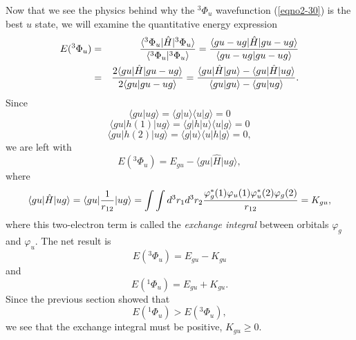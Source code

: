 Now that we see the physics behind why the $^3\Phi_u$ wavefunction
(\ref{eqno2-30}) is the best $u$ state, we will examine the
quantitative energy expression
\begin{eqnarray}
E( ^3\Phi_u) &=& {\langle ^3\Phi_u \vert {\hat H}\vert ^3\Phi_u
\rangle \over \langle ^3\Phi_u \vert ^3\Phi_u \rangle} = {\langle gu -
ug \vert {\hat H} \vert gu - ug \rangle \over \langle gu - ug \vert gu
- ug \rangle}\cr &=& {2 \langle gu \vert {\hat H} \vert gu - ug
\rangle \over 2 \langle gu \vert gu - ug \rangle} = {\langle gu \vert
{\hat H} \vert gu \rangle - \langle gu \vert {\hat H} \vert ug \rangle
\over \langle gu \vert gu \rangle - \langle gu \vert ug \rangle}.
\end{eqnarray}
Since
\begin{equation}
\langle gu \vert ug \rangle = \langle g \vert u \rangle \langle u 
\vert g \rangle = 0
\end{equation}
\begin{equation}
\langle gu \vert h ( 1 ) \vert ug \rangle = \langle g \vert h \vert 
u \rangle \langle u \vert g \rangle = 0
\end{equation}
\begin{equation}
\langle gu \vert h ( 2 ) \vert ug \rangle = \langle g \vert u 
\rangle \langle u \vert h \vert g \rangle = 0,
\end{equation}
we are left with
\begin{equation}
E \left( ^3\Phi_u \right) = E_{gu} - \langle gu \vert {\hat H} \vert 
ug \rangle,
\label{e_trip_u}
\end{equation}
where
\begin{equation}
\langle gu \vert {\hat H} \vert ug \rangle = \langle gu \vert {1 \over 
r_{12}} \vert ug \rangle = \int \int d^3 r_1 d^3 r_2 {\varphi^*_g ( 1 ) 
\varphi_u ( 1 ) \varphi^*_u ( 2 ) \varphi_g ( 2 ) \over r_{12}} 
= K_{gu},
\label{eqno2-32}
\end{equation}
where this two-electron term is called the \emph{exchange integral}
between orbitals $\varphi_g$ and $\varphi_u$. The net result is
\begin{equation}
E \left( {^3\Phi}_u \right) = E_{gu} - K_{gu}
\end{equation}
and
\begin{equation}
E \left( {^1\Phi}_u \right) = E_{gu} + K_{gu}.
\end{equation}
Since the previous section showed that
\begin{equation}
E \left( {^1\Phi}_u \right) > E \left( {^3\Phi}_u \right),
\end{equation}
we see that the exchange integral must be positive, $K_{gu} \geq 0$.

